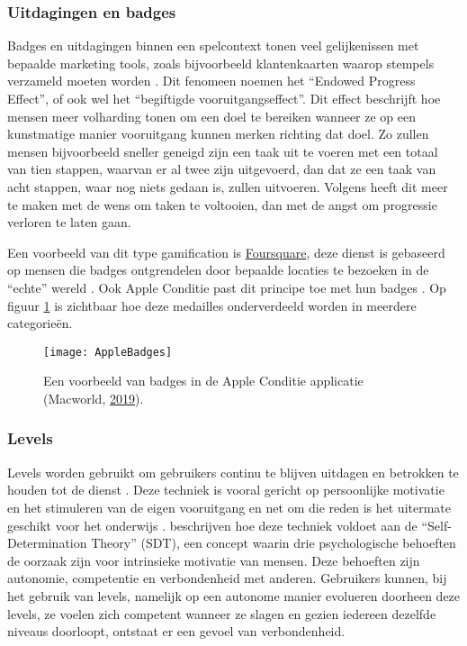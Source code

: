 \subsubsection{Uitdagingen en badges}
Badges en uitdagingen binnen een spelcontext tonen veel gelijkenissen met bepaalde marketing tools, zoals bijvoorbeeld klantenkaarten waarop stempels verzameld moeten worden \autocite{Nunes2006}. Dit fenomeen noemen \textcite{Nunes2006} het ``Endowed Progress Effect'', of ook wel het ``begiftigde vooruitgangseffect''. Dit effect beschrijft hoe mensen meer volharding tonen om een doel te bereiken wanneer ze op een kunstmatige manier vooruitgang kunnen merken richting dat doel. Zo zullen mensen bijvoorbeeld sneller geneigd zijn een taak uit te voeren met een totaal van tien stappen, waarvan er al twee zijn uitgevoerd, dan dat ze een taak van acht stappen, waar nog niets gedaan is, zullen uitvoeren. Volgens \textcite{Nunes2006} heeft dit meer te maken met de wens om taken te voltooien, dan met de angst om progressie verloren te laten gaan.

Een voorbeeld van dit type gamification is \href{https://foursquare.com/}{Foursquare}, deze dienst is gebaseerd op mensen die badges ontgrendelen door bepaalde locaties te bezoeken in de ``echte'' wereld \autocite{Hamari2011}. Ook Apple Conditie past dit principe toe met hun badges \autocite{Ha2020}. Op figuur \ref{fig:apple_badges} is zichtbaar hoe deze medailles onderverdeeld worden in meerdere categorieën.

\begin{figure}[h]
    \caption[Badges in de Apple Conditie applicatie]{Een voorbeeld van badges in de Apple Conditie applicatie (Macworld, \href{https://www.macworld.com/article/231140/how-to-get-all-of-the-apple-watch-activity-challenge-badges.html}{2019}).}
    \texttt{[image: AppleBadges]}
    \label{fig:apple_badges}
\end{figure}

\subsubsection{Levels}
\label{sssec:levels}
Levels worden gebruikt om gebruikers continu te blijven uitdagen en betrokken te houden tot de dienst \autocite{Dong2012}. Deze techniek is vooral gericht op persoonlijke motivatie en het stimuleren van de eigen vooruitgang en net om die reden is het uitermate geschikt voor het onderwijs \autocite{ManzanoLeon2021}.
\textcite{ManzanoLeon2021} beschrijven hoe deze techniek voldoet aan de ``Self-Determination Theory'' (SDT), een concept waarin drie psychologische behoeften de oorzaak zijn voor intrinsieke motivatie van mensen. Deze behoeften zijn autonomie, competentie en verbondenheid met anderen. Gebruikers kunnen, bij het gebruik van levels, namelijk op een autonome manier evolueren doorheen deze levels, ze voelen zich competent wanneer ze slagen en gezien iedereen dezelfde niveaus doorloopt, ontstaat er een gevoel van verbondenheid.

